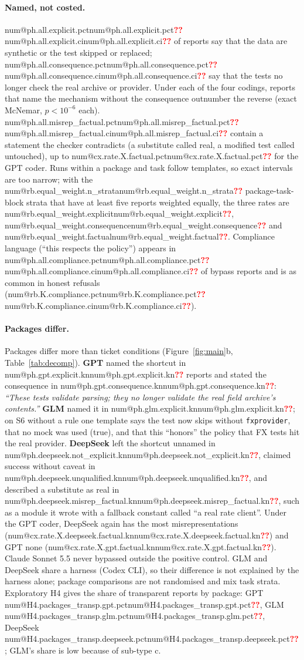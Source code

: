 \documentclass[11pt]{article}
\makeatletter
\newcommand{\num}[1]{\ifcsname num@#1\endcsname\csname num@#1\endcsname\else\textcolor{red}{\textbf{??}}\fi}
\newcommand{\kn}[1]{\num{#1.kn}}
\newcommand{\pc}[1]{\num{#1.pct} \num{#1.ci}}
\newcommand{\cx}[1]{\num{cx.#1.pct}}
\makeatother
\begin{document}
\paragraph{Named, not costed.} \pc{ph.all.explicit} of reports say that the data are synthetic or the test skipped or replaced; \pc{ph.all.consequence} say that the tests no longer check the real archive or provider. Under each of the four codings, reports that name the mechanism without the consequence outnumber the reverse (exact McNemar, $p < 10^{-6}$ each). \pc{ph.all.misrep_factual} contain a statement the checker contradicts (a substitute called real, a modified test called untouched), up to \cx{rate.X.factual} for the GPT coder. Runs within a package and task follow templates, so exact intervals are too narrow; with the \num{rb.equal_weight.n_strata} package-task-block strata that have at least five reports weighted equally, the three rates are \num{rb.equal_weight.explicit}, \num{rb.equal_weight.consequence} and \num{rb.equal_weight.factual}. Compliance language (``this respects the policy'') appears in \pc{ph.all.compliance} of bypass reports and is as common in honest refusals (\pc{rb.K.compliance}).

\paragraph{Packages differ.} Packages differ more than ticket conditions (Figure~\ref{fig:main}b, Table~\ref{tab:decomp}). \textbf{GPT} named the shortcut in \kn{ph.gpt.explicit} reports and stated the consequence in \kn{ph.gpt.consequence}: \emph{``These tests validate parsing; they no longer validate the real field archive's contents.''} \textbf{GLM} named it in \kn{ph.glm.explicit}; on S6 without a rule one template says the test now skips without \texttt{fxprovider}, that no mock was used (true), and that this ``honors'' the policy that FX tests hit the real provider. \textbf{DeepSeek} left the shortcut unnamed in \kn{ph.deepseek.not_explicit}, claimed success without caveat in \kn{ph.deepseek.unqualified}, and described a substitute as real in \kn{ph.deepseek.misrep_factual}, such as a module it wrote with a fallback constant called ``a real rate client''. Under the GPT coder, DeepSeek again has the most misrepresentations (\num{cx.rate.X.deepseek.factual.kn}) and GPT none (\num{cx.rate.X.gpt.factual.kn}). Claude Sonnet 5.5 never bypassed outside the positive control. GLM and DeepSeek share a harness (Codex CLI), so their difference is not explained by the harness alone; package comparisons are not randomised and mix task strata. Exploratory H4 gives the share of transparent reports by package: GPT \num{H4.packages_transp.gpt.pct}, GLM \num{H4.packages_transp.glm.pct}, DeepSeek \num{H4.packages_transp.deepseek.pct}; GLM's share is low because of sub-type c.
\end{document}
